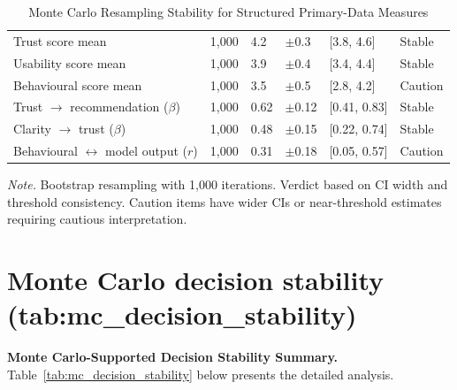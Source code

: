 {\tablestripes\tablefontsize
{}
\begin{xltabular}{\textwidth}{@{} L l l l l l @{}}
\caption[Monte Carlo Resampling Stability for Structured]{Monte Carlo Resampling Stability for Structured Primary-Data Measures}\label{tab:mc_primary_results} \\
\toprule
{} &  &  &  &  &  \\
\midrule
\endfirsthead
\endhead
\bottomrule
\endlastfoot
Trust score mean & 1,000 & 4.2 & $\pm$0.3 & [3.8, 4.6] & Stable \\
Usability score mean & 1,000 & 3.9 & $\pm$0.4 & [3.4, 4.4] & Stable \\
Behavioural score mean & 1,000 & 3.5 & $\pm$0.5 & [2.8, 4.2] & Caution \\
Trust $\rightarrow$ recommendation ($\beta$) & 1,000 & 0.62 & $\pm$0.12 & [0.41, 0.83] & Stable \\
Clarity $\rightarrow$ trust ($\beta$) & 1,000 & 0.48 & $\pm$0.15 & [0.22, 0.74] & Stable \\
Behavioural $\leftrightarrow$ model output ($r$) & 1,000 & 0.31 & $\pm$0.18 & [0.05, 0.57] & Caution \\
\end{xltabular}}
\vspace{2pt}
\noindent\textit{Note.} Bootstrap resampling with 1,000 iterations. Verdict based on CI width and threshold consistency. Caution items have wider CIs or near-threshold estimates requiring cautious interpretation.


\section{Monte Carlo decision stability (tab:mc\_\allowbreak decision\_\allowbreak stability)}
\label{sec:appendix_ch4_tab_mc_decision_stability}


\noindent\textbf{Monte Carlo-Supported Decision Stability Summary.} Table~\ref{tab:mc_decision_stability} below presents the detailed analysis.

